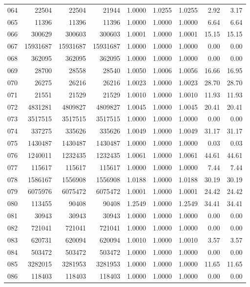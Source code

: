 \begin{longtable}{crrrrrrrr}
064 & 22504 & 22504 & 21944 & 1.0000 & 1.0255 & 1.0255 & 2.92 & 3.17 \\
065 & 11396 & 11396 & 11396 & 1.0000 & 1.0000 & 1.0000 & 6.64 & 6.64 \\
066 & 300629 & 300603 & 300603 & 1.0001 & 1.0000 & 1.0001 & 15.15 & 15.15 \\
067 & 15931687 & 15931687 & 15931687 & 1.0000 & 1.0000 & 1.0000 & 0.00 & 0.00 \\
068 & 362095 & 362095 & 362095 & 1.0000 & 1.0000 & 1.0000 & 0.00 & 0.00 \\
069 & 28700 & 28558 & 28540 & 1.0050 & 1.0006 & 1.0056 & 16.66 & 16.95 \\
070 & 26275 & 26216 & 26216 & 1.0023 & 1.0000 & 1.0023 & 28.70 & 28.70 \\
071 & 21551 & 21529 & 21529 & 1.0010 & 1.0000 & 1.0010 & 11.93 & 11.93 \\
072 & 4831281 & 4809827 & 4809827 & 1.0045 & 1.0000 & 1.0045 & 20.41 & 20.41 \\
073 & 3517515 & 3517515 & 3517515 & 1.0000 & 1.0000 & 1.0000 & 0.00 & 0.00 \\
074 & 337275 & 335626 & 335626 & 1.0049 & 1.0000 & 1.0049 & 31.17 & 31.17 \\
075 & 1430487 & 1430487 & 1430487 & 1.0000 & 1.0000 & 1.0000 & 0.03 & 0.03 \\
076 & 1240011 & 1232435 & 1232435 & 1.0061 & 1.0000 & 1.0061 & 44.61 & 44.61 \\
077 & 115617 & 115617 & 115617 & 1.0000 & 1.0000 & 1.0000 & 7.44 & 7.44 \\
078 & 1586167 & 1556908 & 1556908 & 1.0188 & 1.0000 & 1.0188 & 30.19 & 30.19 \\
079 & 6075976 & 6075472 & 6075472 & 1.0001 & 1.0000 & 1.0001 & 24.42 & 24.42 \\
080 & 113455 & 90408 & 90408 & 1.2549 & 1.0000 & 1.2549 & 34.41 & 34.41 \\
081 & 30943 & 30943 & 30943 & 1.0000 & 1.0000 & 1.0000 & 0.00 & 0.00 \\
082 & 721041 & 721041 & 721041 & 1.0000 & 1.0000 & 1.0000 & 0.00 & 0.00 \\
083 & 620731 & 620094 & 620094 & 1.0010 & 1.0000 & 1.0010 & 3.57 & 3.57 \\
084 & 503472 & 503472 & 503472 & 1.0000 & 1.0000 & 1.0000 & 0.00 & 0.00 \\
085 & 3282015 & 3281953 & 3281953 & 1.0000 & 1.0000 & 1.0000 & 11.65 & 11.65 \\
086 & 118403 & 118403 & 118403 & 1.0000 & 1.0000 & 1.0000 & 0.00 & 0.00 \\

\end{longtable}
